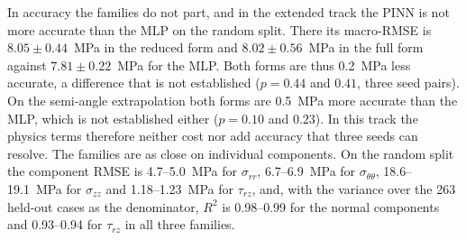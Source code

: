 In accuracy the families do not part, and in the extended track the PINN is not more accurate than the MLP on the random split. There its macro-RMSE is $8.05\pm0.44$~MPa in the reduced form and $8.02\pm0.56$~MPa in the full form against $7.81\pm0.22$~MPa for the MLP. Both forms are thus 0.2~MPa less accurate, a difference that is not established ($p=0.44$ and $0.41$, three seed pairs). On the semi-angle extrapolation both forms are 0.5~MPa more accurate than the MLP, which is not established either ($p=0.10$ and $0.23$). In this track the physics terms therefore neither cost nor add accuracy that three seeds can resolve. The families are as close on individual components. On the random split the component RMSE is 4.7--5.0~MPa for $\sigma_{rr}$, 6.7--6.9~MPa for $\sigma_{\theta\theta}$, 18.6--19.1~MPa for $\sigma_{zz}$ and 1.18--1.23~MPa for $\tau_{rz}$, and, with the variance over the 263 held-out cases as the denominator, $R^2$ is 0.98--0.99 for the normal components and 0.93--0.94 for $\tau_{rz}$ in all three families.

